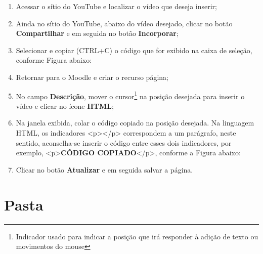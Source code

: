 \begin{enumerate}
\item Acessar o sítio do YouTube e localizar o vídeo que deseja inserir;

\item Ainda no sítio do YouTube, abaixo do vídeo desejado, clicar no botão \textbf{Compartilhar} e em seguida no botão \textbf{Incorporar};

\item Selecionar e copiar (CTRL+C) o código que for exibido na caixa de seleção, conforme Figura abaixo:

 \begin{center}
 \end{center}

\item Retornar para o Moodle e criar o recurso página;
\item No campo \textbf{Descrição}, mover o cursor\footnote{Indicador usado para indicar a posição que irá responder à adição de texto ou movimentos do mouse}  na posição desejada para inserir o vídeo e clicar no ícone \textbf{HTML};
\item Na janela exibida, colar o código copiado na posição desejada. Na linguagem HTML, os indicadores <p></p> correspondem a um parágrafo, neste sentido, aconselha-se inserir o código entre esses dois indicadores, por exemplo, <p>\textbf{CÓDIGO COPIADO}</p>, conforme a Figura abaixo:

 \begin{center}
 \end{center}

\item Clicar no botão \textbf{Atualizar} e em seguida salvar a página.
\end{enumerate}

\section{Pasta}

